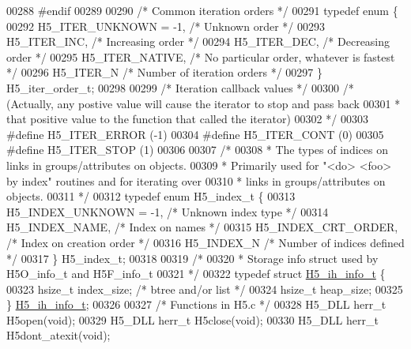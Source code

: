 \begin{DoxyCode}
{{{00288 \textcolor{preprocessor}{#endif}
00289 
00290 \textcolor{comment}{/* Common iteration orders */}
00291 \textcolor{keyword}{typedef} \textcolor{keyword}{enum} \{
00292     H5\_ITER\_UNKNOWN = -1,       \textcolor{comment}{/* Unknown order */}
00293     H5\_ITER\_INC,                \textcolor{comment}{/* Increasing order */}
00294     H5\_ITER\_DEC,                \textcolor{comment}{/* Decreasing order */}
00295     H5\_ITER\_NATIVE,             \textcolor{comment}{/* No particular order, whatever is fastest */}
00296     H5\_ITER\_N               \textcolor{comment}{/* Number of iteration orders */}
00297 \} H5\_iter\_order\_t;
00298 
00299 \textcolor{comment}{/* Iteration callback values */}
00300 \textcolor{comment}{/* (Actually, any postive value will cause the iterator to stop and pass back}
00301 \textcolor{comment}{ *      that positive value to the function that called the iterator)}
00302 \textcolor{comment}{ */}
00303 \textcolor{preprocessor}{#define H5\_ITER\_ERROR   (-1)}
00304 \textcolor{preprocessor}{#define H5\_ITER\_CONT    (0)}
00305 \textcolor{preprocessor}{#define H5\_ITER\_STOP    (1)}
00306 
00307 \textcolor{comment}{/*}
00308 \textcolor{comment}{ * The types of indices on links in groups/attributes on objects.}
00309 \textcolor{comment}{ * Primarily used for "<do> <foo> by index" routines and for iterating over}
00310 \textcolor{comment}{ * links in groups/attributes on objects.}
00311 \textcolor{comment}{ */}
00312 \textcolor{keyword}{typedef} \textcolor{keyword}{enum} H5\_index\_t \{
00313     H5\_INDEX\_UNKNOWN = -1,  \textcolor{comment}{/* Unknown index type           */}
00314     H5\_INDEX\_NAME,      \textcolor{comment}{/* Index on names           */}
00315     H5\_INDEX\_CRT\_ORDER,     \textcolor{comment}{/* Index on creation order      */}
00316     H5\_INDEX\_N          \textcolor{comment}{/* Number of indices defined        */}
00317 \} H5\_index\_t;
00318 
00319 \textcolor{comment}{/*}
00320 \textcolor{comment}{ * Storage info struct used by H5O\_info\_t and H5F\_info\_t}
00321 \textcolor{comment}{ */}
00322 \textcolor{keyword}{typedef} \textcolor{keyword}{struct }\hyperlink{struct_h5__ih__info__t}{H5\_ih\_info\_t} \{
00323     hsize\_t     index\_size;     \textcolor{comment}{/* btree and/or list */}
00324     hsize\_t     heap\_size;
00325 \} \hyperlink{struct_h5__ih__info__t}{H5\_ih\_info\_t};
00326 
00327 \textcolor{comment}{/* Functions in H5.c */}
00328 H5\_DLL herr\_t H5open(\textcolor{keywordtype}{void});
00329 H5\_DLL herr\_t H5close(\textcolor{keywordtype}{void});
00330 H5\_DLL herr\_t H5dont\_atexit(\textcolor{keywordtype}{void});
}}}
\end{DoxyCode}
